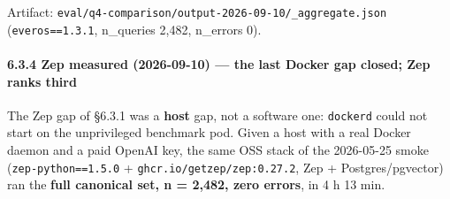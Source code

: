 \documentclass[
]{article}
\begin{document}
Artifact: \texttt{eval/q4-comparison/output-2026-09-10/\_aggregate.json}
(\texttt{everos==1.3.1}, n\_queries 2,482, n\_errors 0).

\paragraph{6.3.4 Zep measured (2026-09-10) --- the last Docker gap
closed; Zep ranks
third}\label{zep-measured-2026-09-10-the-last-docker-gap-closed-zep-ranks-third}

The Zep gap of §6.3.1 was a \textbf{host} gap, not a software one:
\texttt{dockerd} could not start on the unprivileged benchmark pod.
Given a host with a real Docker daemon and a paid OpenAI key, the same
OSS stack of the 2026-05-25 smoke (\texttt{zep-python==1.5.0} +
\texttt{ghcr.io/getzep/zep:0.27.2}, Zep + Postgres/pgvector) ran the
\textbf{full canonical set, n = 2,482, zero errors}, in 4 h 13 min.
\end{document}
